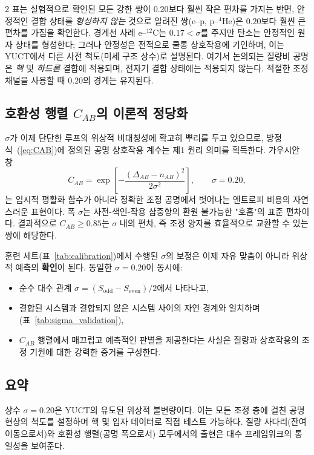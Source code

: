 \documentclass[11pt,a4paper]{article}
\begin{document}
\begin{multicols}{2}
		표는 실험적으로 확인된 모든 강한 쌍이 $0.20$보다 훨씬 작은 편차를 가지는 반면, 안정적인 결합 상태를 \emph{형성하지 않는} 것으로 알려진 쌍(e--p, p--$^4$He)은 $0.20$보다 훨씬 큰 편차를 가짐을 확인한다. 경계선 사례 e--$^{12}$C는 $0.17 < \sigma$를 주지만 탄소는 안정적인 원자 상태를 형성한다; 그러나 안정성은 전적으로 쿨롱 상호작용에 기인하며, 이는 YUCT에서 다른 사전 척도(미세 구조 상수)로 설명된다. 여기서 논의되는 질량비 공명은 \emph{핵} 및 \emph{하드론} 결합에 적용되며, 전자기 결합 상태에는 적용되지 않는다. 적절한 조정 채널을 사용할 때 $0.20$의 경계는 유지된다.
		
		\subsection{호환성 행렬 \(C_{AB}\)의 이론적 정당화}
		
		$\sigma$가 이제 단단한 루프의 위상적 비대칭성에 확고히 뿌리를 두고 있으므로, 방정식~(\ref{eq:CAB})에 정의된 공명 상호작용 계수는 제1 원리 의미를 획득한다. 가우시안 창
		\[
		C_{AB} = \exp\!\left[ -\frac{(\Delta_{AB} - n_{AB})^2}{2\sigma^2} \right],\qquad \sigma = 0.20,
		\]
		는 임시적 평활화 함수가 아니라 정확한 조정 공명에서 벗어나는 엔트로피 비용의 자연스러운 표현이다. 폭 $\sigma$는 사전-색인-작용 삼중항의 환원 불가능한 "호흡"의 표준 편차이다. 결과적으로 $C_{AB} \ge 0.85$는 $\sigma$ 내의 편차, 즉 조정 양자를 효율적으로 교환할 수 있는 쌍에 해당한다.
		
		훈련 세트(표~\ref{tab:calibration})에서 수행된 $\sigma$의 보정은 이제 자유 맞춤이 아니라 위상적 예측의 \textbf{확인}이 된다. 동일한 $\sigma = 0.20$이 동시에:
		\begin{itemize}
			\item 순수 대수 관계 $\sigma = (S_{\mathrm{odd}} - S_{\mathrm{even}})/2$에서 나타나고,
			\item 결합된 시스템과 결합되지 않은 시스템 사이의 자연 경계와 일치하며(표~\ref{tab:sigma_validation}),
			\item $C_{AB}$ 행렬에서 매끄럽고 예측적인 판별을 제공한다는 사실은 질량과 상호작용의 조정 기원에 대한 강력한 증거를 구성한다.
		\end{itemize}
		
		\subsection{요약}
		상수 $\sigma = 0.20$은 YUCT의 유도된 위상적 불변량이다. 이는 모든 조정 층에 걸친 공명 현상의 척도를 설정하며 핵 및 입자 데이터로 직접 테스트 가능하다. 질량 사다리(잔여 이동으로서)와 호환성 행렬(공명 폭으로서) 모두에서의 출현은 대수 프레임워크의 통일성을 보여준다.
		

\end{multicols}
\end{document}
